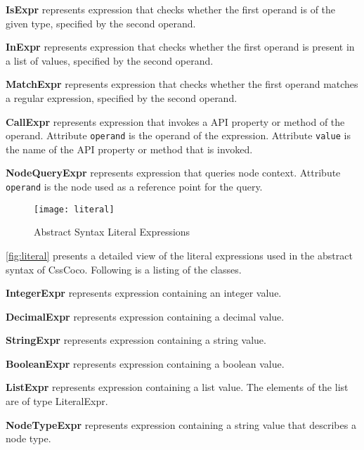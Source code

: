 \begin{description}
\item\textbf{IsExpr} represents expression that checks whether the first operand is of the given type, specified by the second operand.

\item\textbf{InExpr} represents expression that checks whether the first operand is present in a list of values, specified by the second operand.

\item\textbf{MatchExpr} represents expression that checks whether the first operand matches a regular expression, specified by the second operand.

\item\textbf{CallExpr} represents expression that invokes a API property or method of the operand. Attribute \texttt{operand} is the operand of the expression. Attribute \texttt{value} is the name of the API property or method that is invoked.

\item\textbf{NodeQueryExpr} represents expression that queries node context. Attribute \texttt{operand} is the node used as a reference point for the query.

\end{description}

\begin{figure}[h]
  \centering
  \caption{Abstract Syntax Literal Expressions}
  \label{fig:literal}
  \texttt{[image: literal]}
\end{figure}

\autoref{fig:literal} presents a detailed view of the literal expressions used in the abstract syntax of CssCoco. Following is a listing of the classes. 

\begin{description}

\item\textbf{IntegerExpr} represents expression containing an integer value.

\item\textbf{DecimalExpr} represents expression containing a decimal value.

\item\textbf{StringExpr} represents expression containing a string value.

\item\textbf{BooleanExpr} represents expression containing a boolean value.

\item\textbf{ListExpr} represents expression containing a list value. The elements of the list are of type LiteralExpr.

\item\textbf{NodeTypeExpr} represents expression containing a string value that describes a node type.

\end{description}

